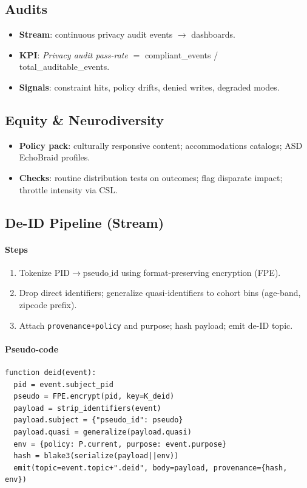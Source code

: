 \documentclass[11pt]{article}
\theoremstyle{plain}
\begin{document}
\subsection{Audits}
\begin{itemize}
  \item \textbf{Stream}: continuous privacy audit events $\rightarrow$ dashboards.
  \item \textbf{KPI}: \emph{Privacy audit pass-rate} $=$ compliant\_events / total\_auditable\_events.
  \item \textbf{Signals}: constraint hits, policy drifts, denied writes, degraded modes.
\end{itemize}

\subsection{Equity \& Neurodiversity}
\begin{itemize}
  \item \textbf{Policy pack}: culturally responsive content; accommodations catalogs; ASD EchoBraid profiles.
  \item \textbf{Checks}: routine distribution tests on outcomes; flag disparate impact; throttle intensity via CSL.
\end{itemize}

\subsection{De-ID Pipeline (Stream)}
\paragraph{Steps}
\begin{enumerate}
  \item Tokenize \(\mathrm{PID}\rightarrow\mathrm{pseudo\_id}\) using format-preserving encryption (FPE).
  \item Drop direct identifiers; generalize quasi-identifiers to cohort bins (age-band, zipcode prefix).
  \item Attach \texttt{provenance+policy} and purpose; hash payload; emit de-ID topic.
\end{enumerate}

\paragraph{Pseudo-code}
\begin{verbatim}
function deid(event):
  pid = event.subject_pid
  pseudo = FPE.encrypt(pid, key=K_deid)
  payload = strip_identifiers(event)
  payload.subject = {"pseudo_id": pseudo}
  payload.quasi = generalize(payload.quasi)
  env = {policy: P.current, purpose: event.purpose}
  hash = blake3(serialize(payload||env))
  emit(topic=event.topic+".deid", body=payload, provenance={hash, env})
\end{verbatim}
\end{document}
